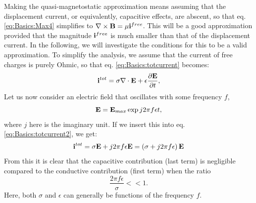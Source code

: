 Making the quasi-magnetostatic approximation means assuming that the displacement current, or equivalently, capacitive effects, are abscent, so that eq. \ref{eq:Basics:Max4} simplifies to $\nabla \times {\bf B}  =  \mu{\bf i}^{free}$. This will be a good approximation provided that the magnitude ${\bf i}^{free}$ is much smaller than that of the displacement current. In the following, we will investigate the conditions for this to be a valid approximation. To simplify the analysis, we assume that the current of free charges is purely Ohmic, so that eq. \ref{eq:Basics:totcurrent} becomes:
\begin{equation}
{\bf i}^{tot} = \sigma \nabla \cdot {\bf E} + \epsilon\frac{\partial {\bf E}}{\partial t}, 
\label{eq:Basics:totcurrent2}
\end{equation}
Let us now consider an electric field that oscillates with some frequency $f$, 
\begin{equation}
{\bf E} = {\bf E}_{max} \exp{j2\pi f \epsilon t}, 
\label{eq:Basics:Ecomponent}
\end{equation}
where $j$ here is the imaginary unit. If we insert this into eq. \ref{eq:Basics:totcurrent2}, we get:
\begin{equation}
{\bf i}^{tot} = \sigma{\bf E} +  j 2 \pi f \epsilon {\bf E} = \left( \sigma + j 2 \pi f \epsilon \right){\bf E}
\label{eq:Basics:totcurrent3}
\end{equation}
From this it is clear that the capacitive contribution (last term) is negligible compared to the conductive contribution (first term) when the ratio
\begin{equation}
\frac{2 \pi f \epsilon}{\sigma} << 1. 
\label{eq:Basics:ratiocondition}
\end{equation}
Here, both $\sigma$ and $\epsilon$ can generally be functions of the frequency $f$. 

